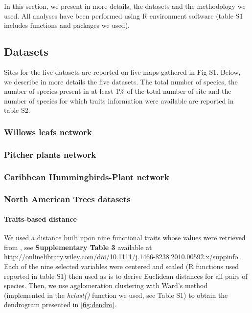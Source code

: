 In this section, we present in more details, the datasets and the
methodology we used. All analyses have been performed using R
environment software (table S1 includes functions and packages we used).

\subsection{Datasets}\label{datasets}

Sites for the five datasets are reported on five maps gathered in Fig
S1. Below, we describe in more details the five datasets. The total
number of species, the number of species present in at least 1\% of the
total number of site and the number of species for which traits
information were available are reported in table S2.

\subsubsection{Willows leafs network}\label{willows-leafs-network}

\subsubsection{Pitcher plants network}\label{pitcher-plants-network}

\subsubsection{Caribbean Hummingbirds-Plant
network}\label{caribbean-hummingbirds-plant-network}

\subsubsection{North American Trees
datasets}\label{north-american-trees-datasets}

\paragraph{Traits-based distance}\label{traits-based-distance}

We used a distance built upon nine functional traits whose values were
retrieved from \citep{Paquette_2010}, see \textbf{Supplementary Table 3}
available at
\url{http://onlinelibrary.wiley.com/doi/10.1111/j.1466-8238.2010.00592.x/suppinfo}.
Each of the nine selected variables were centered and scaled (R
functions used reported in table S1) then used as is to derive Euclidean
distances for all pairs of species. Then, we use agglomeration
clustering with Ward's method (implemented in the \emph{hclust()}
function we used, see Table S1) to obtain the dendrogram presented in
\ref{fig:dendro}.

